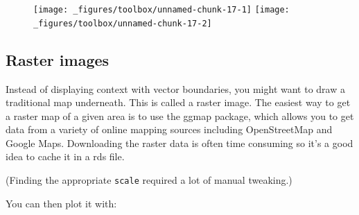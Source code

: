 \begin{figure}[H]
  \texttt{[image: \_figures/toolbox/unnamed-chunk-17-1]}%
  \texttt{[image: \_figures/toolbox/unnamed-chunk-17-2]}
\end{figure}

\subsection{Raster images}\label{raster-images}

Instead of displaying context with vector boundaries, you might want to
draw a traditional map underneath. This is called a raster image. The
easiest way to get a raster map of a given area is to use the ggmap
package, which allows you to get data from a variety of online mapping
sources including OpenStreetMap and Google Maps. Downloading the raster
data is often time consuming so it's a good idea to cache it in a rds
file.  

\begin{Shaded}
\begin{Highlighting}[]
\NormalTok{(}\NormalTok{)) \{}
  \StringTok{ }\NormalTok{(}\NormalTok{)}
  \StringTok{ }\NormalTok{(}
  \NormalTok{)}
  \StringTok{ } \NormalTok{)}
  \NormalTok{)}
\NormalTok{\}}
\end{Highlighting}
\end{Shaded}

(Finding the appropriate \texttt{scale} required a lot of manual
tweaking.)

You can then plot it with:

\begin{Shaded}
\begin{Highlighting}[]

\StringTok{ }
\StringTok{  }\NormalTok{(}\NormalTok{(}  \NormalTok{) +}\StringTok{ }
\StringTok{  }\NormalTok{()}
\end{Highlighting}
\end{Shaded}

